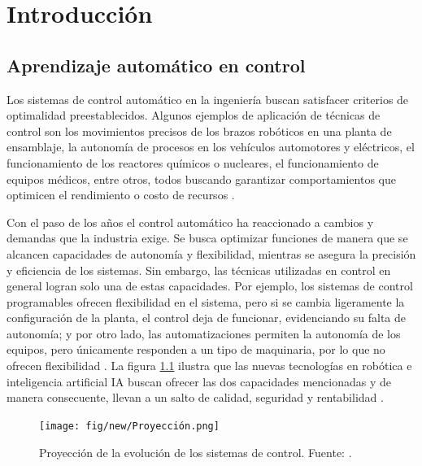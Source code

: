 \chapter{Introducción}
\label{chp:intro}

\section{Aprendizaje automático en control}

Los sistemas de control automático en la ingeniería buscan satisfacer criterios de optimalidad preestablecidos. Algunos ejemplos de aplicación de técnicas de control son los movimientos precisos de los brazos robóticos en una planta de ensamblaje, la autonomía de procesos en los vehículos automotores y eléctricos, el funcionamiento de los reactores químicos o nucleares, el funcionamiento de equipos médicos, entre otros, todos buscando garantizar comportamientos que optimicen el rendimiento o costo de recursos \cite{Kuo}.

Con el paso de los años el control automático ha reaccionado a cambios y demandas que la industria exige. Se busca optimizar funciones de manera que se alcancen capacidades de autonomía y flexibilidad, mientras se asegura la precisión y eficiencia de los sistemas. Sin embargo, las técnicas utilizadas en control en general logran solo una de estas capacidades. Por ejemplo, los sistemas de control programables ofrecen flexibilidad en el sistema, pero si se cambia ligeramente la configuración de la planta, el control deja de funcionar, evidenciando su falta de autonomía; y por otro lado, las automatizaciones permiten la autonomía de los equipos, pero únicamente responden a un tipo de maquinaria, por lo que no ofrecen flexibilidad \cite{Dorf}. La figura \ref{fig:Controlproj} ilustra que las nuevas tecnologías en robótica e inteligencia artificial IA buscan ofrecer las dos capacidades mencionadas y de manera consecuente, llevan a un salto de calidad, seguridad y rentabilidad \cite{Dorf} \cite{AI}.

\begin{figure}[hh]
	\centering
	\texttt{[image: fig/new/Proyección.png]}
	\caption{Proyección de la evolución de los sistemas de control. Fuente: \cite{Dorf}.}
	\label{fig:Controlproj}
\end{figure}

